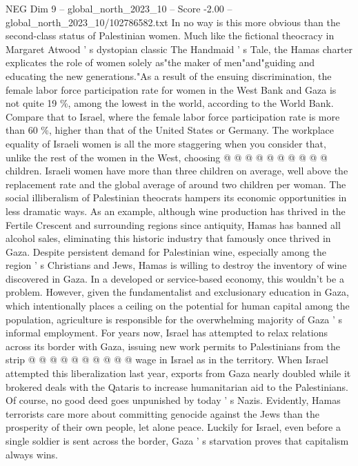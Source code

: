 \begin{textsample}{NEG Dim 9 – global\_north\_2023\_10 – Score -2.00 – global\_north\_2023\_10/102786582.txt}
In no way is this more obvious than the second-class status of Palestinian women.
Much like the fictional theocracy in Margaret Atwood ' s dystopian classic The Handmaid ' s Tale, the Hamas charter explicates the role of women solely as"the maker of men"and"guiding and educating the new generations."As a result of the ensuing discrimination, the female labor force participation rate for women in the West Bank and Gaza is not quite 19 \%, among the lowest in the world, according to the World Bank.
Compare that to Israel, where the female labor force participation rate is more than 60 \%, higher than that of the United States or Germany.
The workplace equality of Israeli women is all the more staggering when you consider that, unlike the rest of the women in the West, choosing @ @ @ @ @ @ @ @ @ @ children.
Israeli women have more than three children on average, well above the replacement rate and the global average of around two children per woman.
The social illiberalism of Palestinian theocrats hampers its economic opportunities in less dramatic ways.
As an example, although wine production has thrived in the Fertile Crescent and surrounding regions since antiquity, Hamas has banned all alcohol sales, eliminating this historic industry that famously once thrived in Gaza.
Despite persistent demand for Palestinian wine, especially among the region ' s Christians and Jews, Hamas is willing to destroy the inventory of wine discovered in Gaza.
In a developed or service-based economy, this wouldn't be a problem.
However, given the fundamentalist and exclusionary education in Gaza, which intentionally places a ceiling on the potential for human capital among the population, agriculture is responsible for the overwhelming majority of Gaza ' s informal employment.
For years now, Israel has attempted to relax relations across its border with Gaza, issuing new work permits to Palestinians from the strip @ @ @ @ @ @ @ @ @ @ wage in Israel as in the territory.
When Israel attempted this liberalization last year, exports from Gaza nearly doubled while it brokered deals with the Qataris to increase humanitarian aid to the Palestinians.
Of course, no good deed goes unpunished by today ' s Nazis.
Evidently, Hamas terrorists care more about committing genocide against the Jews than the prosperity of their own people, let alone peace.
Luckily for Israel, even before a single soldier is sent across the border, Gaza ' s starvation proves that capitalism always wins.

\end{textsample}
